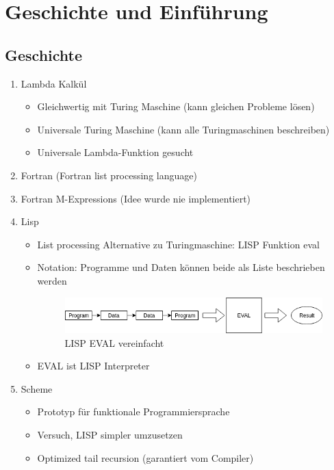 \section{Geschichte und Einführung}

\subsection{Geschichte}

\begin{enumerate}
    \item Lambda Kalkül
        \begin{itemize}
            \item Gleichwertig mit Turing Maschine (kann gleichen Probleme lösen)
            \item Universale Turing Maschine (kann alle Turingmaschinen beschreiben)
            \item Universale Lambda-Funktion gesucht
        \end{itemize}

    \item Fortran (Fortran list processing language)

    \item Fortran M-Expressions (Idee wurde nie implementiert)

    \item Lisp
        \begin{itemize}
            \item List processing Alternative zu Turingmaschine: LISP Funktion eval
            \item Notation: Programme und Daten können beide als Liste beschrieben werden
                \begin{figure}[h!]
                	\includegraphics[width=\linewidth]{pics/lisp-notation}
                	\caption{LISP EVAL vereinfacht}
                \end{figure}
            \item EVAL ist LISP Interpreter
        \end{itemize}

    \item Scheme
        \begin{itemize}
            \item Prototyp für funktionale Programmiersprache
            \item Versuch, LISP simpler umzusetzen
            \item Optimized tail recursion (garantiert vom Compiler)
        \end{itemize}
\end{enumerate}

